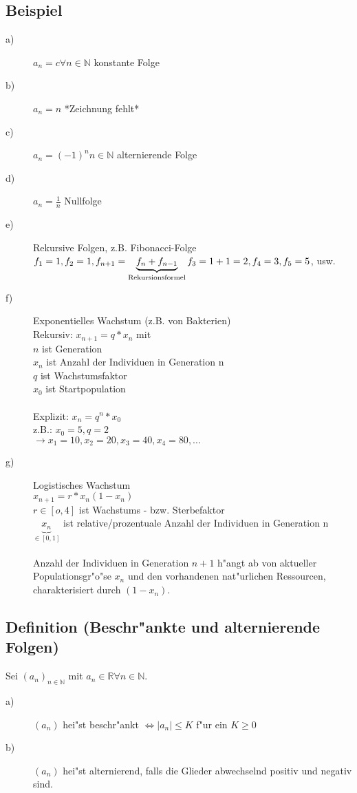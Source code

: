 \documentclass[12pt,a4paper]{article}
\begin{document}
\subsection{Beispiel}
\begin{description}
\item[a)]
$a_n = c \forall n \in \mathbb{N}$ konstante Folge
\item[b)]
$a_n = n$
*Zeichnung fehlt*
\item[c)]
$a_n = (-1)^n n \in \mathbb{N}$ alternierende Folge
\item[d)]
$a_n = \frac{1}{n}$ Nullfolge
\item[e)]
Rekursive Folgen, z.B. Fibonacci-Folge \\
$f_1 = 1, f_2 = 1 , f_{n+1} = 
\underbrace{f_n + f_{n-1}}_{\text{\normalfont Rekursionsformel}} \\
f_3 = 1+1=2, f_4 = 3 , f_5 = 5$, usw.
\item[f)]
Exponentielles Wachstum (z.B. von Bakterien) \\
Rekursiv: $x_{n+1} = q * x_n$ mit \\
$n$ ist Generation \\
$x_n$ ist Anzahl der Individuen in Generation n \\
$q$ ist Wachstumsfaktor \\
$x_0$ ist Startpopulation \\
\\
Explizit: $x_n = q^n * x_0$ \\
z.B.: $x_0 = 5 , q = 2$ \\
$\rightarrow x_1 = 10, x_2 = 20, x_3 = 40, x_4 = 80, ...$
\item[g)]
Logistisches Wachstum \\
$x_{n+1} = r * x_n (1- x_n)$ \\
$r \in [o,4]$ ist Wachstums - bzw. Sterbefaktor \\
$ \underbrace{x_n}_{\in [0,1]}$ ist relative/prozentuale Anzahl der Individuen in Generation n \\
\\
Anzahl der Individuen in Generation $n+1$ h"angt ab von aktueller Populationsgr"o"se $x_n$ und den vorhandenen nat"urlichen Ressourcen, charakterisiert durch $(1-x_n)$.
\end{description}
\subsection{Definition (Beschr"ankte und alternierende Folgen)}
Sei $(a_n)_{n \in \mathbb{N}}$ mit $a_n \in \mathbb{R} \forall n \in \mathbb{N}$.
\begin{description}
\item[a)]
$(a_n)$ hei"st beschr"ankt $\Leftrightarrow |a_n| \leq K$ f"ur ein $K \geq 0$
\item[b)]
$(a_n)$ hei"st alternierend, falls die Glieder abwechselnd positiv und negativ sind.
\end{description}
\end{document}
